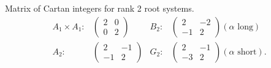 Matrix of Cartan integers for rank 2 root systems.
\begin{align*}
	A_1\times A_1:&\left(\begin{array}{rr}2 & 0\\0 & 2\end{array}\right) &B_2:&\left(\begin{array}{rr}2 & -2\\-1 & 2\end{array}\right) (\alpha \textrm{ long}) \\
	A_2:&\left(\begin{array}{rr}2 & -1\\-1 & 2\end{array}\right) &G_2:&\left(\begin{array}{rr}2 & -1\\-3 & 2\end{array}\right) (\alpha \textrm{ short}).
\end{align*}
